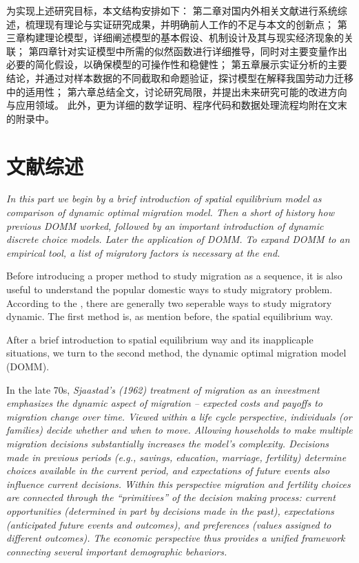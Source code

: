 \documentclass[a4paper,12pt]{article}
\begin{document}
为实现上述研究目标，本文结构安排如下：  
第二章对国内外相关文献进行系统综述，梳理现有理论与实证研究成果，并明确前人工作的不足与本文的创新点；  
第三章构建理论模型，详细阐述模型的基本假设、机制设计及其与现实经济现象的关联；  
第四章针对实证模型中所需的似然函数进行详细推导，同时对主要变量作出必要的简化假设，以确保模型的可操作性和稳健性；  
第五章展示实证分析的主要结论，并通过对样本数据的不同截取和命题验证，探讨模型在解释我国劳动力迁移中的适用性；  
第六章总结全文，讨论研究局限，并提出未来研究可能的改进方向与应用领域。  
此外，更为详细的数学证明、程序代码和数据处理流程均附在文末的附录中。



\section{文献综述}

\begin{center}
  \textit{
    In this part we begin by a brief introduction of spatial equilibrium model as comparison of dynamic optimal migration model. Then a short of history how previous DOMM worked, followed by an important introduction of dynamic discrete choice models. Later the application of DOMM. To expand DOMM to an empirical tool, a list of migratory factors is necessary at the end.
  }
\end{center}


Before introducing a proper method to study migration as a sequence, it is also useful to understand the popular domestic ways to study migratory problem. According to the \cite{jiaEconomicsInternalMigration2023}, there are generally two seperable ways to study migratory dynamic. The first method is, as mention before, the spatial equilibrium way. 







After a brief introduction to spatial equilibrium way and its inapplicaple situations, we turn to the second method, the dynamic optimal migration model (DOMM).

In the late 70s, 
\textit{Sjaastad’s (1962) treatment of migration as an investment emphasizes the dynamic aspect of migration – expected costs and payoffs to migration change over time. Viewed  within a life cycle perspective, individuals (or families) decide whether and when to  move. Allowing households to make multiple migration decisions substantially increases the model’s complexity. Decisions made in previous periods (e.g., savings, education,  marriage, fertility) determine choices available in the current period, and expectations  of future events also influence current decisions. Within this perspective migration and  fertility choices are connected through the “primitives” of the decision making process:  current opportunities (determined in part by decisions made in the past), expectations (anticipated future events and outcomes), and preferences (values assigned to different outcomes). The economic perspective thus provides a unified framework connecting several important demographic behaviors.}
\end{document}

